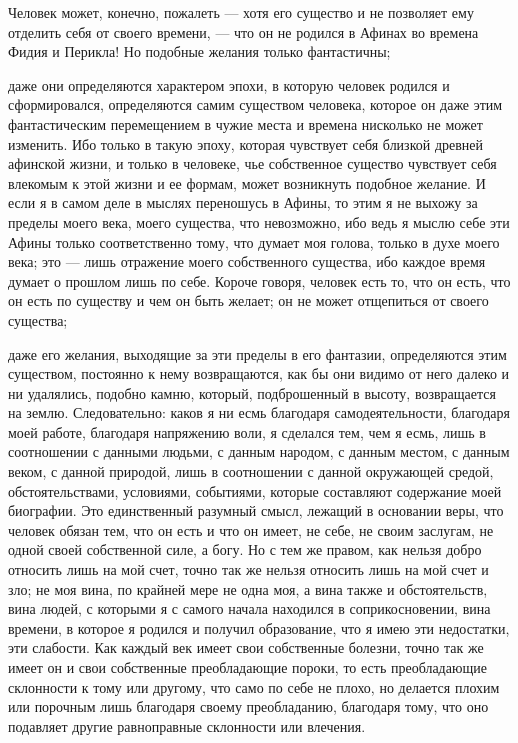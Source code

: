\documentclass[12pt]{article}
\begin{document}
Человек может, конечно, пожалеть --- хотя его существо и не позволяет ему отделить себя от своего времени, --- что он не родился в Афинах во времена Фидия и Перикла! Но подобные желания только фантастичны; 

даже они определяются характером эпохи, в которую человек родился и сформировался, определяются самим существом человека, которое он даже этим фантастическим перемещением в чужие места и времена нисколько не может изменить. Ибо только в такую эпоху, которая чувствует себя близкой древней афинской жизни, и только в человеке, чье собственное существо чувствует себя влекомым к этой жизни и ее формам, может возникнуть подобное желание. И если я в самом деле в мыслях переношусь в Афины, то этим я не выхожу за пределы моего века, моего существа, что невозможно, ибо ведь я мыслю себе эти Афины только соответственно тому, что думает моя голова, только в духе моего века; это --- лишь отражение моего собственного существа, ибо каждое время думает о прошлом лишь по себе. Короче говоря, человек есть то, что он есть, что он есть по существу и чем он быть желает; он не может отщепиться от своего существа; 

даже его желания, выходящие за эти пределы в его фантазии, определяются этим существом, постоянно к нему возвращаются, как бы они видимо от него далеко и ни удалялись, подобно камню, который, подброшенный в высоту, возвращается на землю. Следовательно: каков я ни есмь благодаря самодеятельности, благодаря моей работе, благодаря напряжению воли, я сделался тем, чем я есмь, лишь в соотношении с данными людьми, с данным народом, с данным местом, с данным веком, с данной природой, лишь в соотношении с данной окружающей средой, обстоятельствами, условиями, событиями, которые составляют содержание моей биографии. Это единственный разумный смысл, лежащий в основании веры, что человек обязан тем, что он есть и что он имеет, не себе, не своим заслугам, не одной своей собственной силе, а богу. Но с тем же правом, как нельзя добро относить лишь на мой счет, точно так же нельзя относить лишь на мой счет и зло; не моя вина, по крайней мере не одна моя, а вина также и обстоятельств, вина людей, с которыми я с самого начала находился в соприкосновении, вина времени, в которое я родился и получил образование, что я имею эти недостатки, эти слабости. Как каждый век имеет свои собственные болезни, точно так же имеет он и свои собственные преобладающие пороки, то есть преобладающие склонности к тому или другому, что само по себе не плохо, но делается плохим или порочным лишь благодаря своему преобладанию, благодаря тому, что оно подавляет другие  равноправные склонности или влечения. 
\end{document}
